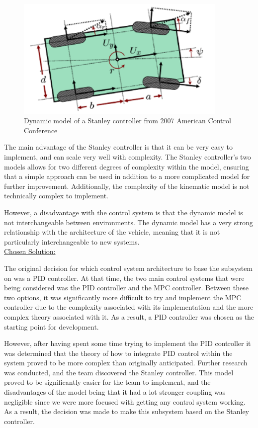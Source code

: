 \documentclass[titlepage,draft]{article}
\begin{document}
{\begin{figure}
	\centering
	\includegraphics[width=4in]{stanley_dynamic}
	\caption{Dynamic model of a Stanley controller from 2007 American Control Conference \cite{4282788}}
	\label{fig:standyna}
\end{figure}

The main advantage of the Stanley controller is that it can be very easy to implement, and can scale very well with complexity. The Stanley controller's two models allows for two different degrees of complexity within the model, ensuring that a simple approach can be used in addition to a more complicated model for further improvement. Additionally, the complexity of the kinematic model is not technically complex to implement.

However, a disadvantage with the control system is that the dynamic model is not interchangeable between environments. The dynamic model has a very strong relationship with the architecture of the vehicle, meaning that it is not particularly interchangeable to new systems.
\\

\underline{Chosen Solution:}

The original decision for which control system architecture to base the subsystem on was a PID controller. At that time, the two main control systems that were being considered was the PID controller and the MPC controller. Between these two options, it was significantly more difficult to try and implement the MPC controller due to the complexity associated with its implementation and the more complex theory associated with it. As a result, a PID controller was chosen as the starting point for development.

However, after having spent some time trying to implement the PID controller it was determined that the theory of how to integrate PID control within the system proved to be more complex than originally anticipated. Further research was conducted, and the team discovered the Stanley controller. This model proved to be significantly easier for the team to implement, and the disadvantages of the model being that it had a lot stronger coupling was negligible since we were more focused with getting any control system working. As a result, the decision was made to make this subsystem based on the Stanley controller.

}
\end{document}
